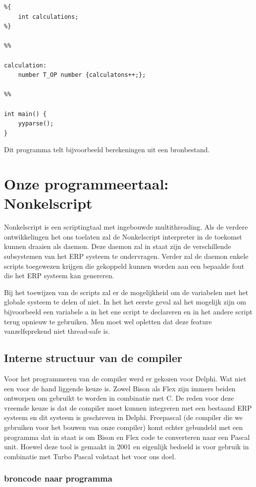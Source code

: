\documentclass[11pt,a4paper]{article}
\begin{document}
\begin{verbatim}
%{
	int calculations;
%}

%%

calculation:
	number T_OP number {calculatons++;};

%%

int main() {
	yyparse();
}
\end{verbatim}

Dit programma telt bijvoorbeeld berekeningen uit een bronbestand.

\section{Onze programmeertaal: Nonkelscript}
Nonkelscript is een scriptingtaal met ingebouwde multithreading. Als de verdere ontwikkelingen het ons toelaten zal de Nonkelscript interpreter in de toekomst kunnen draaien als daemon. Deze daemon zal in staat zijn de verschillende subsystemen van het ERP systeem te ondervragen. Verder zal de daemon enkele scripts toegewezen krijgen die gekoppeld kunnen worden aan een bepaalde fout die het ERP systeem kan genereren.

Bij het toewijzen van de scripts zal er de mogelijkheid om de variabelen met het globale systeem te delen of niet. In het het eerste geval zal het mogelijk zijn om bijvoorbeeld een variabele a in het ene script te declareren en in het andere script terug opnieuw te gebruiken. Men moet wel opletten dat deze feature vanzelfsprekend niet thread-safe is.

\subsection{Interne structuur van de compiler}
Voor het programmeren van de compiler werd er gekozen voor Delphi. Wat niet een voor de hand liggende keuze is. Zowel Bison als Flex zijn immers beiden ontworpen om gebruikt te worden in combinatie met C. De reden voor deze vreemde keuze is dat de compiler moet kunnen integreren met een bestaand ERP systeem en dit systeem is geschreven in Delphi. Freepascal (de compiler die we gebruiken voor het bouwen van onze compiler) komt echter gebundeld met een programma dat in staat is om Bison en Flex code te converteren naar een Pascal unit. Hoewel deze tool is gemaakt in 2001 en eigenlijk bedoeld is voor gebruik in combinatie met Turbo Pascal volstaat het voor ons doel.

\subsubsection{broncode naar programma}
\end{document}
